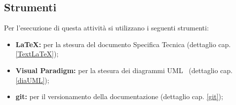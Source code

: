 {\subsection{Strumenti} {
Per l'esecuzione di questa attività si utilizzano i seguenti strumenti:
\begin{itemize}
	\item []{\textbf{\LaTeX :} per la stesura del documento Specifica Tecnica (dettaglio cap. \ref{TextLaTeX});}
	\item []{\textbf{Visual Paradigm:} per la stesura dei diagrammi UML\g~ (dettaglio cap. \ref{diaUML});}
	\item []{\textbf{git:} per il versionamento della documentazione (dettaglio cap. \ref{git});}
\end{itemize}

}%

}%